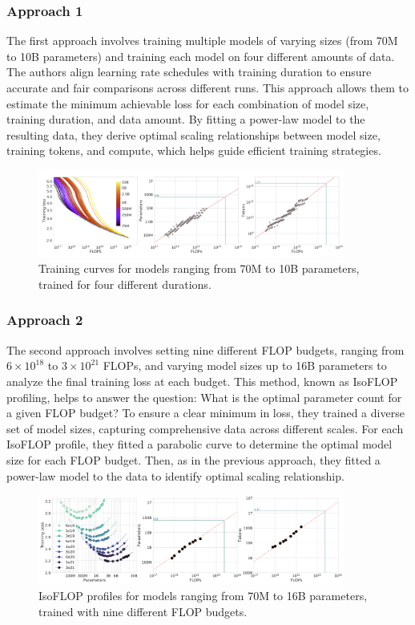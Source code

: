 \documentclass{article}
\begin{document}
\subsubsection{Approach 1}
The first approach involves training multiple models of varying sizes (from 70M to 10B parameters) and training each model on four different amounts of data. The authors align learning rate schedules with training duration to ensure accurate and fair comparisons across different runs. This approach allows them to estimate the minimum achievable loss for each combination of model size, training duration, and data amount. By fitting a power-law model to the resulting data, they derive optimal scaling relationships between model size, training tokens, and compute, which helps guide efficient training strategies.
\begin{figure}[h]
    \centering
    \includegraphics[width=0.9\textwidth]{figs/Approach1.png}
    \caption{Training curves for models ranging from 70M to 10B parameters, trained for four different durations.}
    \label{fig:approach1}
\end{figure}
\subsubsection{Approach 2}
The second approach involves setting nine different FLOP budgets, ranging from $6 \times 10^{18}$ to $3 \times 10^{21}$ FLOPs, and varying model sizes up to 16B parameters to analyze the final training loss at each budget. This method, known as IsoFLOP profiling, helps to answer the question: What is the optimal parameter count for a given FLOP budget? To ensure a clear minimum in loss, they trained a diverse set of model sizes, capturing comprehensive data across different scales. For each IsoFLOP profile, they fitted a parabolic curve to determine the optimal model size for each FLOP budget. Then, as in the previous approach, they fitted a power-law model to the data to identify optimal scaling relationship.
\begin{figure}[h]
    \centering
    \includegraphics[width=0.9\textwidth]{figs/Approach2.png}
    \caption{IsoFLOP profiles for models ranging from 70M to 16B parameters, trained with nine different FLOP budgets.}
    \label{fig:approach2}
\end{figure}
\end{document}
